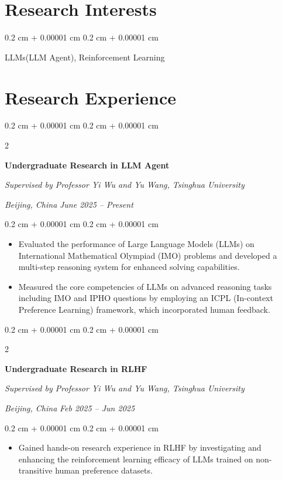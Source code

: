 \documentclass[11pt, letterpaper]{article}
\newenvironment{highlights}{
    \begin{itemize}[
        topsep=0.10 cm,
        parsep=0.10 cm,
        partopsep=0pt,
        itemsep=0pt,
        leftmargin=0.4 cm + 10pt
    ]
}{
    \end{itemize}
} %
\newenvironment{onecolentry}{
    \begin{adjustwidth}{
        0.2 cm + 0.00001 cm
    }{
        0.2 cm + 0.00001 cm
    }
}{
    \end{adjustwidth}
} %
\newenvironment{twocolentry}[2][]{
    \onecolentry{}
    \def\secondColumn{#2}
    \setcolumnwidth{\fill, 4.5 cm}
    \begin{paracol}{2}
}{
    \switchcolumn{}\raggedleft{}\secondColumn{}
    \end{paracol}
    \endonecolentry{}
} %
\begin{document}
\section{Research Interests}

\begin{onecolentry}
    LLMs(LLM Agent), Reinforcement Learning
\end{onecolentry}

\section{Research Experience}

\begin{twocolentry}{
    \textit{Beijing, China}
    \textit{June 2025 – Present}}
    \textbf{Undergraduate Research in LLM Agent}
    
    \textit{Supervised by Professor Yi Wu and Yu Wang, Tsinghua University}
\end{twocolentry}

\vspace{0.15 cm}
\begin{onecolentry}
    \begin{highlights}
        \item Evaluated the performance of Large Language Models (LLMs) on International Mathematical Olympiad (IMO) problems and developed a multi-step reasoning system for enhanced solving capabilities.
        
        \item Measured the core competencies of LLMs on advanced reasoning tasks including IMO and IPHO questions by employing an ICPL (In-context Preference Learning) framework, which incorporated human feedback.
    \end{highlights}
\end{onecolentry}

\vspace{0.3 cm}

\begin{twocolentry}{
    \textit{Beijing, China}
    \textit{Feb 2025 – Jun 2025}}
    \textbf{Undergraduate Research in RLHF}
    
    \textit{Supervised by Professor Yi Wu and Yu Wang, Tsinghua University}
\end{twocolentry}

\vspace{0.15 cm}
\begin{onecolentry}
    \begin{highlights}
        \item Gained hands-on research experience in RLHF by investigating and enhancing the reinforcement learning efficacy of LLMs trained on non-transitive human preference datasets.
    \end{highlights}
\end{onecolentry}
\end{document}
